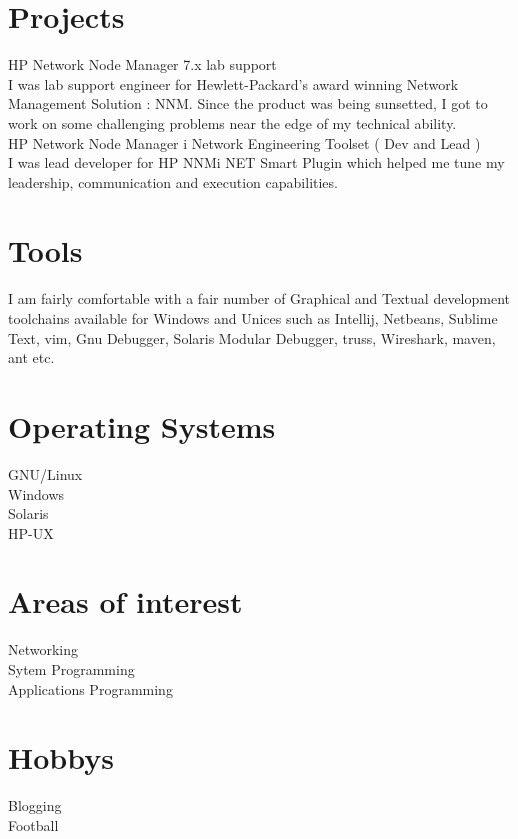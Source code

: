 \documentclass[line,margin]{res}
\begin{document}
\begin{resume}
\section{Projects}
HP Network Node Manager 7.x lab support\\

I was lab support engineer for Hewlett-Packard's award winning Network Management Solution : NNM. Since the product was being sunsetted, I got to work on some challenging problems near the edge of my technical ability.\\

HP Network Node Manager i Network Engineering Toolset ( Dev and Lead )\\

I was lead developer for HP NNMi NET Smart Plugin which helped me tune my leadership, communication and execution capabilities.\\

\section{Tools}
I am fairly comfortable with a fair number of Graphical and Textual development toolchains available for Windows and Unices such as Intellij, Netbeans, Sublime Text, vim, Gnu Debugger, Solaris Modular Debugger, truss, Wireshark, maven, ant etc.\\

\section{Operating Systems}
GNU/Linux\\
Windows\\
Solaris\\
HP-UX\\

\section{Areas of interest}
Networking\\
Sytem Programming\\
Applications Programming\\

\section{Hobbys}
Blogging\\
Football\\


\end{resume}
\end{document}
